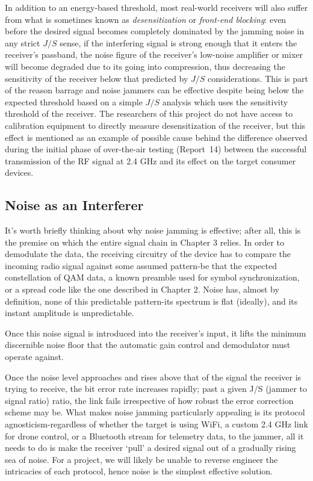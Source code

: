 \documentclass[12pt,a4paper]{report}
\begin{document}
	In addition to an energy-based threshold, most real-world receivers will also suffer from what is sometimes known as \emph{desensitization} or \emph{front-end blocking}: even before the desired signal becomes completely dominated by the jamming noise in any strict $J/S$ sense, if the interfering signal is strong enough that it enters the receiver's passband, the noise figure of the receiver's low-noise amplifier or mixer will become degraded due to its going into compression, thus decreasing the sensitivity of the receiver below that predicted by $J/S$ considerations. This is part of the reason barrage and noise jammers can be effective despite being below the expected threshold based on a simple $J/S$ analysis which uses the sensitivity threshold of the receiver. The researchers of this project do not have access to calibration equipment to directly measure desensitization of the receiver, but this effect is mentioned as an example of possible cause behind the difference observed during the initial phase of over-the-air testing (Report~14) between the successful transmission of the RF signal at 2.4 GHz and its effect on the target consumer devices.
	\subsection{Noise as an Interferer}
	It’s worth briefly thinking about why noise jamming is effective; after all, this is the premise on which the entire signal chain in Chapter 3 relies. In order to demodulate the data, the receiving circuitry of the device has to compare the incoming radio signal against some assumed pattern-be that the expected constellation of QAM data, a known preamble used for symbol synchronization, or a spread code like the one described in Chapter 2. Noise has, almost by definition, none of this predictable pattern-its spectrum is flat (ideally), and its instant amplitude is unpredictable. 
	
	Once this noise signal is introduced into the receiver’s input, it lifts the minimum discernible noise floor that the automatic gain control and demodulator must operate against. 
	
	Once the noise level approaches and rises above that of the signal the receiver is trying to receive, the bit error rate increases rapidly; past a given J/S (jammer to signal ratio) ratio, the link fails irrespective of how robust the error correction scheme may be. What makes noise jamming particularly appealing is its protocol agnosticism-regardless of whether the target is using WiFi, a custom 2.4 GHz link for drone control, or a Bluetooth stream for telemetry data, to the jammer, all it needs to do is make the receiver ‘pull’ a desired signal out of a gradually rising sea of noise. For a project, we will likely be unable to reverse engineer the intricacies of each protocol, hence noise is the simplest effective solution.
	
\end{document}
